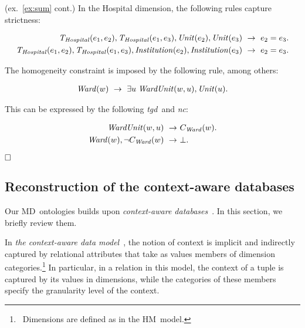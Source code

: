 \documentclass[format=acmsmall, review=false, screen=true]{acmart}
\newcommand{\boxtheorem}{\ensuremath{\hfill \Box}}
\newcommand{\nit}[1]{{\it #1}}
\newcommand{\nc}{{\em nc}}
\newcommand{\hm}{HM}
\newcommand{\md}{MD}
\newcommand{\tgd}{{\em tgd}}
\begin{document}
{\begin{example} (ex.~\ref{ex:sum} cont.) \label{ex:sumrules} In the {\sf Hospital} dimension, the following rules capture strictness:

\vspace{-4mm}
\begin{align*}
\nit{T}_\nit{Hospital}(e_1,e_2),\nit{T}_\nit{Hospital}(e_1,e_3),\nit{Unit}(e_2),\nit{Unit}(e_3) ~\rightarrow~  e_2=e_3.\\
\nit{T}_\nit{Hospital}(e_1,e_2),\nit{T}_\nit{Hospital}(e_1,e_3),\nit{Institution}(e_2),\nit{Institution}(e_3) ~\rightarrow~  e_2=e_3.
\end{align*}
\vspace{-4mm}

\noindent The homogeneity constraint is imposed by the following rule, among others:

\vspace{-4mm}
\begin{align*}
{\it Ward}(w) ~\rightarrow~ \exists u\;\nit{WardUnit}(w,u),{\it Unit}(u).
\end{align*}
\vspace{-4mm}

\noindent This can be expressed by the following \tgd \ and \nc:

\vspace{-4mm}
\begin{align*}
\nit{WardUnit}(w,u) ~\rightarrow&~ C_\nit{Ward}(w).\\
{\it Ward}(w), \lnot C_\nit{Ward}(w) ~\rightarrow&~ \bot.
\end{align*}

\vspace*{-6mm}\boxtheorem
\end{example}

\subsection{Reconstruction of the context-aware databases} \label{sec:omd-ca}

Our \md \ ontologies builds upon {\em context-aware databases}~\cite{martinenghi-qa,martinenghi-er,martinenghi-vldb}. In this section, we briefly review them.

In {\em the context-aware data model}~\cite{martinenghi-qa}, the notion of context is implicit and indirectly captured by relational attributes that take as values members of dimension categories.\footnote{\ Dimensions are defined as in the \hm \ model.} In particular, in a relation in this model, the context of a tuple is captured by its values in dimensions, while the categories of these members specify the granularity level of the context.

}
\end{document}
